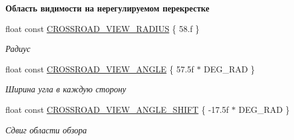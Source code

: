 \begin{Indent}\textbf{ Область видимости на нерегулируемом перекрестке}\par
\begin{DoxyCompactItemize}
\item 
\mbox{\label{namespacertm_ae5df71baa1c995b0418d8e22252ba6fa}} 
float const \hyperlink{namespacertm_ae5df71baa1c995b0418d8e22252ba6fa}{C\+R\+O\+S\+S\+R\+O\+A\+D\+\_\+\+V\+I\+E\+W\+\_\+\+R\+A\+D\+I\+US} \{ 58.f \}
\begin{DoxyCompactList}\small\item\em Радиус \end{DoxyCompactList}\item 
\mbox{\label{namespacertm_a5b9c1ba0abe7dd1259bc4c34a0022cda}} 
float const \hyperlink{namespacertm_a5b9c1ba0abe7dd1259bc4c34a0022cda}{C\+R\+O\+S\+S\+R\+O\+A\+D\+\_\+\+V\+I\+E\+W\+\_\+\+A\+N\+G\+LE} \{ 57.\+5f $\ast$ D\+E\+G\+\_\+\+R\+A\+D \}
\begin{DoxyCompactList}\small\item\em Ширина угла в каждую сторону \end{DoxyCompactList}\item 
\mbox{\label{namespacertm_ae04c779dfc5b406c04ff9a549423c910}} 
float const \hyperlink{namespacertm_ae04c779dfc5b406c04ff9a549423c910}{C\+R\+O\+S\+S\+R\+O\+A\+D\+\_\+\+V\+I\+E\+W\+\_\+\+A\+N\+G\+L\+E\+\_\+\+S\+H\+I\+FT} \{ -\/17.\+5f $\ast$ D\+E\+G\+\_\+\+R\+A\+D \}
\begin{DoxyCompactList}\small\item\em Сдвиг области обзора \end{DoxyCompactList}\end{DoxyCompactItemize}
\end{Indent}
